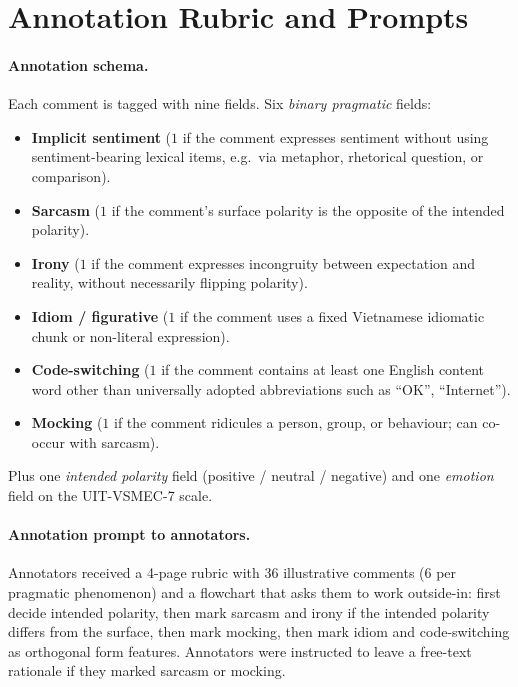 \section{Annotation Rubric and Prompts}
\label{app:annotation}

\paragraph{Annotation schema.}
Each comment is tagged with nine fields. Six \emph{binary pragmatic}
fields:
\begin{itemize}\itemsep1pt
  \item \textbf{Implicit sentiment} ($1$ if the comment expresses
    sentiment without using sentiment-bearing lexical items, e.g.\
    via metaphor, rhetorical question, or comparison).
  \item \textbf{Sarcasm} ($1$ if the comment's surface polarity is
    the opposite of the intended polarity).
  \item \textbf{Irony} ($1$ if the comment expresses incongruity
    between expectation and reality, without necessarily flipping
    polarity).
  \item \textbf{Idiom / figurative} ($1$ if the comment uses a fixed
    Vietnamese idiomatic chunk or non-literal expression).
  \item \textbf{Code-switching} ($1$ if the comment contains at least
    one English content word other than universally adopted
    abbreviations such as ``OK'', ``Internet'').
  \item \textbf{Mocking} ($1$ if the comment ridicules a person,
    group, or behaviour; can co-occur with sarcasm).
\end{itemize}
Plus one \emph{intended polarity} field (positive / neutral /
negative) and one \emph{emotion} field on the UIT-VSMEC-7 scale.

\paragraph{Annotation prompt to annotators.}
Annotators received a 4-page rubric with $36$ illustrative comments
($6$ per pragmatic phenomenon) and a flowchart that asks them to
work outside-in: first decide intended polarity, then mark sarcasm
and irony if the intended polarity differs from the surface,
then mark mocking, then mark idiom and code-switching as orthogonal
form features. Annotators were instructed to leave a free-text
rationale if they marked sarcasm or mocking.

